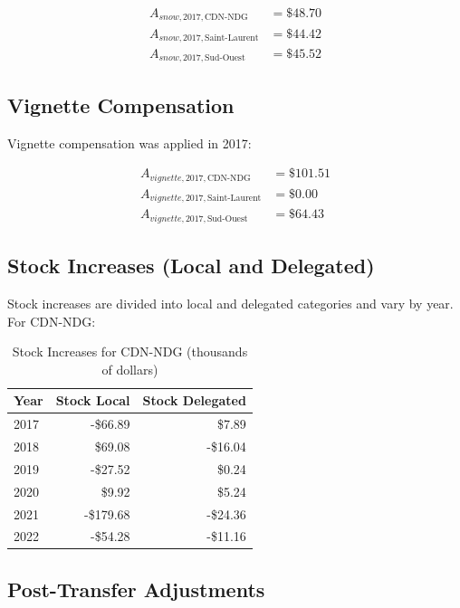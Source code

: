 \documentclass{article}
\begin{document}
\begin{equation}
\begin{aligned}
A_{snow,2017,\text{CDN-NDG}} &= \$48.70 \\
A_{snow,2017,\text{Saint-Laurent}} &= \$44.42 \\
A_{snow,2017,\text{Sud-Ouest}} &= \$45.52
\end{aligned}
\end{equation}

\subsection{Vignette Compensation}

Vignette compensation was applied in 2017:

\begin{equation}
\begin{aligned}
A_{vignette,2017,\text{CDN-NDG}} &= \$101.51 \\
A_{vignette,2017,\text{Saint-Laurent}} &= \$0.00 \\
A_{vignette,2017,\text{Sud-Ouest}} &= \$64.43
\end{aligned}
\end{equation}

\subsection{Stock Increases (Local and Delegated)}

Stock increases are divided into local and delegated categories and vary by year. For CDN-NDG:

\begin{table}[h]
\centering
\begin{tabular}{lrr}
\toprule
Year & Stock Local & Stock Delegated \\
\midrule
2017 & -\$66.89 & \$7.89 \\
2018 & \$69.08 & -\$16.04 \\
2019 & -\$27.52 & \$0.24 \\
2020 & \$9.92 & \$5.24 \\
2021 & -\$179.68 & -\$24.36 \\
2022 & -\$54.28 & -\$11.16 \\
\bottomrule
\end{tabular}
\caption{Stock Increases for CDN-NDG (thousands of dollars)}
\end{table}

\subsection{Post-Transfer Adjustments}
\end{document}
